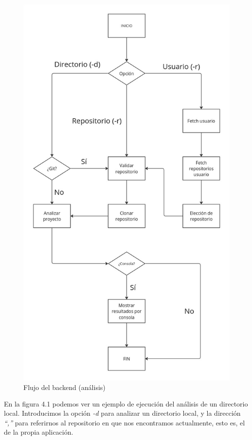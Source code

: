 \documentclass[a4paper, 12pt]{book}
\begin{document}
\begin{figure}[H]
  \centering
  \includegraphics[height=\textheight, keepaspectratio]{img/esquema_backend_final.jpg}
  \caption{Flujo del backend (análisis)}
  \label{fig:execution_local}
\end{figure}

En la figura 4.1 podemos ver un ejemplo de ejecución del análisis de un directorio local. Introducimos la opción \textit{-d} para analizar un directorio local, y la dirección \textit{``,''} para referirnos al repositorio en que nos encontramos actualmente, esto es, el de la propia aplicación. 
\end{document}
